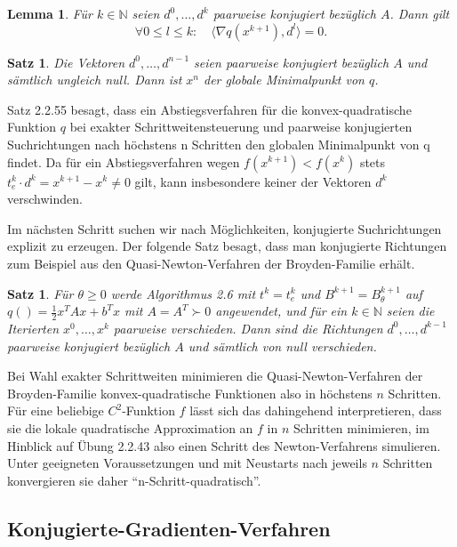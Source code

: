 \documentclass[11pt]{scrreprt}
\newcounter{thm}
\theoremstyle{thmstyle}
\numberwithin{thm}{section}
\newtheorem{lemma}[thm]{Lemma}
\newtheorem{satz}[thm]{Satz}
\begin{document}
\begin{lemma}
	Für $k\in \mathbb{N}$ seien $d^0, \dotsc, d^k$ paarweise konjugiert bezüglich $A$. Dann gilt
	$$ \forall 0 \leq l \leq k: \quad \langle \nabla q(x^{k+1}), d^l \rangle = 0. $$
\end{lemma}		

\begin{satz}
	Die Vektoren $d^0, \dotsc, d^{n-1}$ seien paarweise konjugiert bezüglich $A$ und sämtlich ungleich null. Dann ist $x^n$ der globale Minimalpunkt von $q$.
\end{satz}
		
Satz 2.2.55 besagt, dass ein Abstiegsverfahren für die konvex-quadratische Funktion $q$ bei exakter Schrittweitensteuerung und paarweise konjugierten Suchrichtungen nach höchstens n Schritten den globalen Minimalpunkt von q findet. Da für ein Abstiegsverfahren wegen $f (x^{k+1}) < f(x^k)$ stets $t_e^k \cdot d^k = x^{k+1} - x^k \neq 0$ gilt, kann insbesondere keiner der Vektoren $d^k$ verschwinden. ~\bigskip

Im nächsten Schritt suchen wir nach Möglichkeiten, konjugierte Suchrichtungen explizit zu erzeugen. Der folgende Satz besagt, dass man konjugierte Richtungen zum Beispiel aus den Quasi-Newton-Verfahren der Broyden-Familie erhält.

\begin{satz}
	Für $\theta \geq 0$ werde Algorithmus 2.6 mit $t^k = t_e^k$ und $B^{k+1} = B^{k+1}_{\theta}$ auf $q() = \frac{1}{2} x^T A x + b^T x$ mit $A = A^T \succ 0$ angewendet, und für ein $k \in \mathbb{N}$ seien die Iterierten $x^0, \dotsc, x^k$ paarweise verschieden. Dann sind die Richtungen $d^0, \dotsc, d^{k-1}$ paarweise konjugiert bezüglich $A$ und sämtlich von null verschieden.
\end{satz}

Bei Wahl exakter Schrittweiten minimieren die Quasi-Newton-Verfahren der Broyden-Familie konvex-quadratische Funktionen also in höchstens $n$ Schritten. Für eine beliebige $C^2$-Funktion $f$ lässt sich das dahingehend interpretieren, dass sie die lokale quadratische Approximation an $f$ in $n$ Schritten minimieren, im Hinblick auf Übung 2.2.43 also einen Schritt des Newton-Verfahrens simulieren. Unter geeigneten Voraussetzungen und mit Neustarts nach jeweils $n$ Schritten konvergieren sie daher \enquote{n-Schritt-quadratisch}.

\subsection*{Konjugierte-Gradienten-Verfahren}
\end{document}
